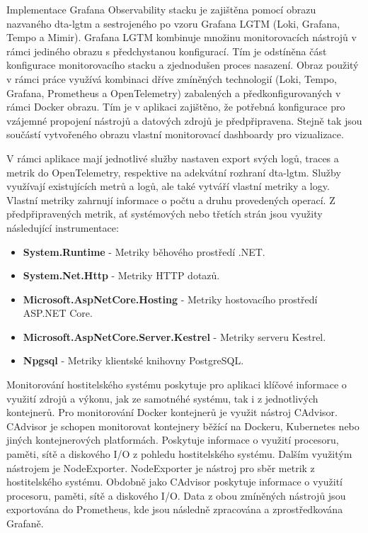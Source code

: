 Implementace Grafana Observability stacku je zajištěna pomocí obrazu nazvaného dta-lgtm a sestrojeného po vzoru Grafana LGTM (Loki, Grafana, Tempo a Mimir). Grafana LGTM kombinuje množinu monitorovacích nástrojů v rámci jediného obrazu s předchystanou konfigurací. Tím je odstíněna část konfigurace monitorovacího stacku a zjednodušen proces nasazení. Obraz použitý v rámci práce využívá kombinaci dříve zmíněných technologií (Loki, Tempo, Grafana, Prometheus a OpenTelemetry) zabalených a předkonfigurovaných v rámci Docker obrazu. Tím je v aplikaci zajištěno, že potřebná konfigurace pro vzájemné propojení nástrojů a datových zdrojů je předpřipravena. Stejně tak jsou součástí vytvořeného obrazu vlastní monitorovací dashboardy pro vizualizace.

V rámci aplikace mají jednotlivé služby nastaven export svých logů, traces a metrik do OpenTelemetry, respektive na adekvátní rozhraní dta-lgtm. Služby využívají existujících metrů a logů, ale také vytváří vlastní metriky a logy. Vlastní metriky zahrnují informace o počtu a druhu provedených operací. Z předpřipravených metrik, ať systémových nebo třetích strán jsou využity následující instrumentace:

\begin{itemize}
  \item \textbf{System.Runtime} - Metriky běhového prostředí .NET.
  \item \textbf{System.Net.Http} - Metriky HTTP dotazů.
  \item \textbf{Microsoft.AspNetCore.Hosting} - Metriky hostovacího prostředí ASP.NET Core.
  \item \textbf{Microsoft.AspNetCore.Server.Kestrel} - Metriky serveru Kestrel.
  \item \textbf{Npgsql} - Metriky klientské knihovny PostgreSQL.
\end{itemize}


Monitorování hostitelského systému poskytuje pro aplikaci klíčové informace o využití zdrojů a výkonu, jak ze samotnéhé systému, tak i z jednotlivých kontejnerů. Pro monitorování Docker kontejnerů je využit nástroj CAdvisor. CAdvisor je schopen monitorovat kontejnery běžící na Dockeru, Kubernetes nebo jiných kontejnerových platformách. Poskytuje informace o využití procesoru, paměti, sítě a diskového I/O z pohledu hostitelského systému. Dalším využitým nástrojem je NodeExporter. NodeExporter je nástroj pro sběr metrik z hostitelského systému. Obdobně jako CAdvisor poskytuje informace o využití procesoru, paměti, sítě a diskového I/O. Data z obou zmíněných nástrojů jsou exportována do Prometheus, kde jsou následně zpracována a zprostředkována Grafaně.

